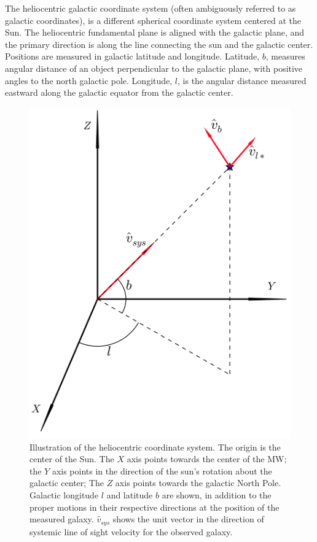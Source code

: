 \documentclass[iop,apj,twocolappendix,numberedappendix]{emulateapj}
\begin{document}
\par The heliocentric galactic coordinate system (often ambiguously referred to as galactic coordinates), is a different spherical coordinate system centered at the Sun.  The heliocentric fundamental plane is aligned with the galactic plane, and the primary direction is along the line connecting the sun and the galactic center.  Positions are measured in galactic latitude and longitude. Latitude, $b$, measures angular distance of an object perpendicular to the galactic plane, with positive angles to the north galactic pole. Longitude, $l$, is the angular distance measured eastward along the galactic equator from the galactic center.

\begin{figure}[ht]
\includegraphics[width=\linewidth]{figures/hel_sys.png}
\caption{Illustration of the heliocentric coordinate system. The origin is the center of the Sun. The $X$ axis points towards the center of the MW; the $Y$ axis points in the direction of the sun's rotation about the galactic center; The $Z$ axis points towards the galactic North Pole. Galactic longitude $l$ and latitude $b$ are shown, in addition to the proper motions in their respective directions at the position of the measured galaxy. $\hat{v}_{sys}$ shows the unit vector in the direction of systemic line of sight velocity for the observed galaxy.}
\label{fig:hel_sys}
\end{figure}
\end{document}
